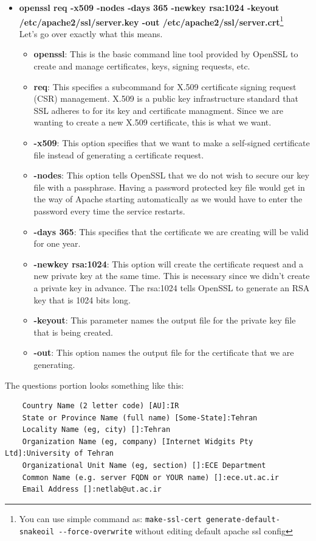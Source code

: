 \documentclass[10pt,a4paper]{article}
\numberwithin{equation}{section}
\numberwithin{figure}{section}
\numberwithin{table}{section}
\begin{document}
	\begin{itemize}
		\item \textbf{openssl req -x509 -nodes -days 365 -newkey rsa:1024 -keyout /etc/apache2/ssl/server.key -out /etc/apache2/ssl/server.crt}\footnote{You can use simple command as: \texttt{make-ssl-cert generate-default-snakeoil -{}-force-overwrite} without editing default apache ssl config}\\
		Let's go over exactly what this means.\\
		\begin{itemize}
			\item \textbf{openssl}: This is the basic command line tool provided by OpenSSL to create and manage certificates, keys, signing requests, etc.
			\item \textbf{req}: This specifies a subcommand for X.509 certificate signing request (CSR) management. X.509 is a public key infrastructure standard that SSL adheres to for its key and certificate managment. Since we are wanting to create a new X.509 certificate, this is what we want.
			\item \textbf{-x509}: This option specifies that we want to make a self-signed certificate file instead of generating a certificate request.
			\item \textbf{-nodes}: This option tells OpenSSL that we do not wish to secure our key file with a passphrase. Having a password protected key file would get in the way of Apache starting automatically as we would have to enter the password every time the service restarts.
			\item \textbf{-days 365}: This specifies that the certificate we are creating will be valid for one year.
			\item \textbf{-newkey rsa:1024}: This option will create the certificate request and a new private key at the same time. This is necessary since we didn't create a private key in advance. The rsa:1024 tells OpenSSL to generate an RSA key that is 1024 bits long.
			\item \textbf{-keyout}: This parameter names the output file for the private key file that is being created.
			\item \textbf{-out}: This option names the output file for the certificate that we are generating.	
		\end{itemize}
	\end{itemize}

	The questions portion looks something like this:
	\begin{verbatim}
	Country Name (2 letter code) [AU]:IR 
	State or Province Name (full name) [Some-State]:Tehran 
	Locality Name (eg, city) []:Tehran 
	Organization Name (eg, company) [Internet Widgits Pty Ltd]:University of Tehran 
	Organizational Unit Name (eg, section) []:ECE Department 
	Common Name (e.g. server FQDN or YOUR name) []:ece.ut.ac.ir 
	Email Address []:netlab@ut.ac.ir 
	\end{verbatim}
\end{document}
